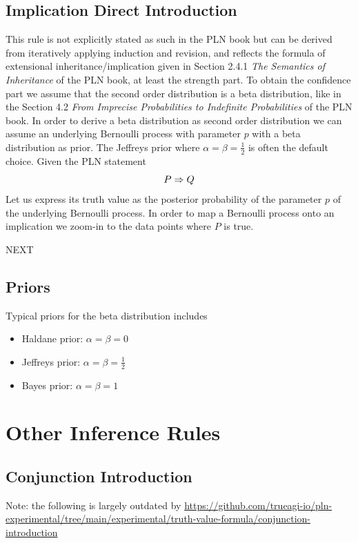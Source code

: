 \documentclass[]{article}
\begin{document}
\subsection{Implication Direct Introduction}
\label{sec:impldirect}
This rule is not explicitly stated as such in the PLN book but can be
derived from iteratively applying induction and revision, and reflects
the formula of extensional inheritance/implication given in Section
2.4.1 \emph{The Semantics of Inheritance} of the PLN book, at least
the strength part.  To obtain the confidence part we assume that the
second order distribution is a beta distribution, like in the Section
4.2 \emph{From Imprecise Probabilities to Indefinite Probabilities} of
the PLN book.  In order to derive a beta distribution as second order
distribution we can assume an underlying Bernoulli process with
parameter $p$ with a beta distribution as prior.  The Jeffreys prior
where $\alpha=\beta=\frac{1}{2}$ is often the default choice.  Given
the PLN statement
$$P \Rightarrow Q$$ Let us express its truth value as the posterior
probability of the parameter $p$ of the underlying Bernoulli process.
In order to map a Bernoulli process onto an implication we zoom-in to
the data points where $P$ is true.

NEXT

\subsection{Priors}
Typical priors for the beta distribution includes
\begin{itemize}
\item Haldane prior: $\alpha=\beta=0$
\item Jeffreys prior: $\alpha=\beta=\frac{1}{2}$
\item Bayes prior: $\alpha=\beta=1$
\end{itemize}

\section{Other Inference Rules}
\subsection{Conjunction Introduction}
Note: the following is largely outdated by
\url{https://github.com/trueagi-io/pln-experimental/tree/main/experimental/truth-value-formula/conjunction-introduction}\\
\end{document}
